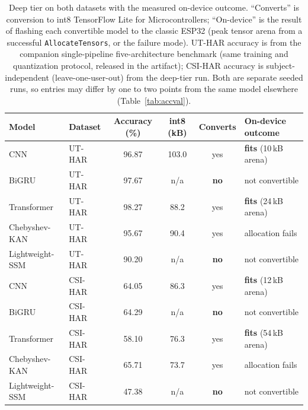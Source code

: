 \documentclass{ieeeaccess}
\begin{document}
\begin{table}[t]
\caption{Deep tier on both datasets with the measured on-device outcome. ``Converts'' is conversion to int8 TensorFlow Lite for Microcontrollers; ``On-device'' is the result of flashing each convertible model to the classic ESP32 (peak tensor arena from a successful \texttt{AllocateTensors}, or the failure mode). UT-HAR accuracy is from the companion single-pipeline five-architecture benchmark (same training and quantization protocol, released in the artifact); CSI-HAR accuracy is subject-independent (leave-one-user-out) from the deep-tier run. Both are separate seeded runs, so entries may differ by one to two points from the same model elsewhere (Table~\ref{tab:accval}).}
\label{tab:deep}
\centering
\begin{tabular}{llcccl}
\toprule
Model & Dataset & Accuracy (\%) & int8 (kB) & Converts & On-device outcome \\
\midrule
CNN             & UT-HAR  & 96.87 & 103.0 & yes & \textbf{fits} (10\,kB arena) \\
BiGRU           & UT-HAR  & 97.67 & n/a   & \textbf{no}  & not convertible \\
Transformer     & UT-HAR  & 98.27 & 88.2  & yes & \textbf{fits} (24\,kB arena) \\
Chebyshev-KAN   & UT-HAR  & 95.67 & 90.4  & yes & allocation fails \\
Lightweight-SSM & UT-HAR  & 90.20 & n/a   & \textbf{no}  & not convertible \\
\midrule
CNN             & CSI-HAR & 64.05 & 86.3  & yes & \textbf{fits} (12\,kB arena) \\
BiGRU           & CSI-HAR & 64.29 & n/a   & \textbf{no}  & not convertible \\
Transformer     & CSI-HAR & 58.10 & 76.3  & yes & \textbf{fits} (54\,kB arena) \\
Chebyshev-KAN   & CSI-HAR & 65.71 & 73.7  & yes & allocation fails \\
Lightweight-SSM & CSI-HAR & 47.38 & n/a   & \textbf{no}  & not convertible \\
\bottomrule
\end{tabular}
\end{table}
\end{document}
